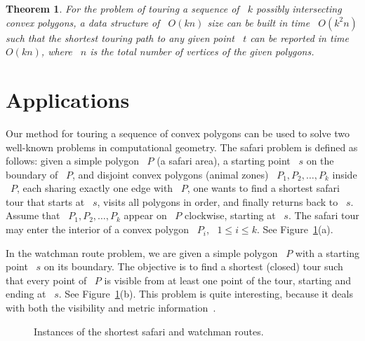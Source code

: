 \documentclass[11pt]{article}
\newtheorem{theorem}{Theorem}
\begin{document}
\begin{theorem}
\label{thm:intersecting}
For the problem of touring a sequence of ~\(k\) possibly intersecting convex polygons, a data structure of ~\(O(kn)\) size can be built in time ~\(O(k^2n)\) such that the shortest touring path to any given point ~\(t\) can be reported in time ~\(O(kn)\), where ~\(n\) is the total number of vertices of the given polygons.
\end{theorem}

\section{Applications}
\label{sec:applications}

Our method for touring a sequence of convex polygons can be used to solve two well-known problems in computational geometry.
The safari problem is defined as follows: given a simple polygon ~\(P\) (a safari area), a starting point ~\(s\) on the boundary of ~\(P\), and disjoint convex polygons (animal zones) ~\(P_1, P_2, \ldots, P_k\) inside ~\(P\), each sharing exactly one edge with ~\(P\), one wants to find a shortest safari tour that starts at ~\(s\), visits all polygons in order, and finally returns back to ~\(s\).
Assume that ~\(P_1, P_2, \ldots, P_k\) appear on ~\(P\) clockwise, starting at ~\(s\).
The safari tour may enter the interior of a convex polygon ~\(P_i\), ~\(1 \le i \le k\).
See Figure~\ref{fig:safariwatchman}(a).

In the watchman route problem, we are given a simple polygon ~\(P\) with a starting point ~\(s\) on its boundary.
The objective is to find a shortest (closed) tour such that every point of ~\(P\) is visible from at least one point of the tour, starting and ending at ~\(s\).
See Figure~\ref{fig:safariwatchman}(b).
This problem is quite interesting, because it deals with both the visibility and metric information~\cite{ref5,ref9}.

\begin{figure}[H]
	\centering
	\caption{Instances of the shortest safari and watchman routes.}
	\label{fig:safariwatchman}
\end{figure}
\end{document}
